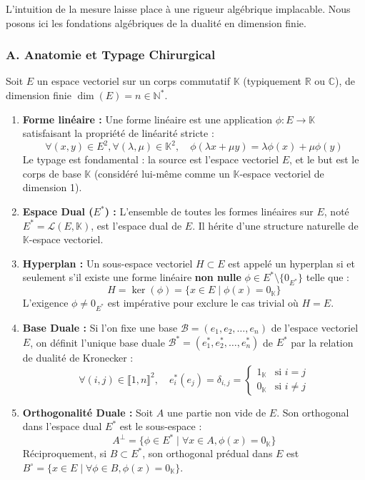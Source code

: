 L'intuition de la mesure laisse place à une rigueur algébrique
implacable. Nous posons ici les fondations algébriques de la dualité en
dimension finie.

\hypertarget{a.-anatomie-et-typage-chirurgical}{%
\subsubsection{A. Anatomie et Typage
Chirurgical}\label{a.-anatomie-et-typage-chirurgical}}

Soit \(E\) un espace vectoriel sur un corps commutatif \(\mathbb{K}\)
(typiquement \(\mathbb{R}\) ou \(\mathbb{C}\)), de dimension finie
\(\dim(E) = n \in \mathbb{N}^*\).

\begin{enumerate}
\def\labelenumi{\arabic{enumi}.}
\item
  \textbf{Forme linéaire :} Une forme linéaire est une application
  \(\phi : E \to \mathbb{K}\) satisfaisant la propriété de linéarité
  stricte :
  \[ \forall (x, y) \in E^2, \forall (\lambda, \mu) \in \mathbb{K}^2, \quad \phi(\lambda x + \mu y) = \lambda \phi(x) + \mu \phi(y) \]
  Le typage est fondamental : la source est l'espace vectoriel \(E\), et
  le but est le corps de base \(\mathbb{K}\) (considéré lui-même comme
  un \(\mathbb{K}\)-espace vectoriel de dimension 1).
\item
  \textbf{Espace Dual (\(E^*\)) :} L'ensemble de toutes les formes
  linéaires sur \(E\), noté \(E^* = \mathcal{L}(E, \mathbb{K})\), est
  l'espace dual de \(E\). Il hérite d'une structure naturelle de
  \(\mathbb{K}\)-espace vectoriel.
\item
  \textbf{Hyperplan :} Un sous-espace vectoriel \(H \subset E\) est
  appelé un hyperplan si et seulement s'il existe une forme linéaire
  \textbf{non nulle} \(\phi \in E^* \setminus \{0_{E^*}\}\) telle que :
  \[ H = \ker(\phi) = \{ x \in E \mid \phi(x) = 0_{\mathbb{K}} \} \]
  L'exigence \(\phi \neq 0_{E^*}\) est impérative pour exclure le cas
  trivial où \(H = E\).
\item
  \textbf{Base Duale :} Si l'on fixe une base
  \(\mathcal{B} = (e_1, e_2, \dots, e_n)\) de l'espace vectoriel \(E\),
  on définit l'unique base duale
  \(\mathcal{B}^* = (e_1^*, e_2^*, \dots, e_n^*)\) de \(E^*\) par la
  relation de dualité de Kronecker :
  \[ \forall (i, j) \in \llbracket 1, n \rrbracket^2, \quad e_i^*(e_j) = \delta_{i,j} = \begin{cases} 1_{\mathbb{K}} & \text{si } i = j \\ 0_{\mathbb{K}} & \text{si } i \neq j \end{cases} \]
\item
  \textbf{Orthogonalité Duale :} Soit \(A\) une partie non vide de
  \(E\). Son orthogonal dans l'espace dual \(E^*\) est le sous-espace :
  \[ A^\perp = \{ \phi \in E^* \mid \forall x \in A, \phi(x) = 0_{\mathbb{K}} \} \]
  Réciproquement, si \(B \subset E^*\), son orthogonal prédual dans
  \(E\) est
  \(B^\circ = \{ x \in E \mid \forall \phi \in B, \phi(x) = 0_{\mathbb{K}} \}\).
\end{enumerate}

